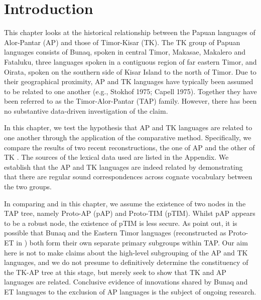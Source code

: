 \section{Introduction}
This chapter looks at the historical relationship between the Papuan languages of Alor-Pantar (AP) and those of Timor-Kisar (TK). The TK group of Papuan languages consists of Bunaq, spoken in central Timor, Makasae, Makalero and Fataluku, three languages spoken in a contiguous region of far eastern Timor, and Oirata, spoken on the southern side of Kisar Island to the north of Timor. Due to their geographical proximity, AP and TK languages have typically been assumed to be related to one another (e.g., Stokhof 1975; Capell 1975). Together they have been referred to as the Timor-Alor-Pantar (TAP) family. However, there has been no substantive data-driven investigation of the claim.

In this chapter, we test the hypothesis that AP and TK languages are related to one another through the application of the comparative method. Specifically, we compare the results of two recent reconstructions, the one of AP \citep{HoltonEtAl2012} and the other of TK \citep{SchapperEtAl2012}. The sources of the lexical data used are listed in the Appendix. We establish that the AP and TK languages are indeed related by demonstrating that there are regular sound correspondences across cognate vocabulary between the two groups. 

In comparing \citet{HoltonEtAl2012} and \citet{SchapperEtAl2012} in this chapter, we assume the existence of two nodes in the TAP tree, namely Proto-AP (pAP) and Proto-TIM (pTIM). Whilst pAP appears to be a robust node, the existence of pTIM is less secure. As \citet[227-228]{SchapperEtAl2012} point out, it is possible that Bunaq and the Eastern Timor languages (reconstructed as Proto-ET in \citealt{SchapperEtAl2012}) both form their own separate primary subgroups within TAP. Our aim here is not to make claims about the high-level subgrouping of the AP and TK languages, and we do not presume to definitively determine the constituency of the TK-AP tree at this stage, but merely seek to show that TK and AP languages are related. Conclusive evidence of innovations shared by Bunaq and ET languages to the exclusion of AP languages is the subject of ongoing research. 


